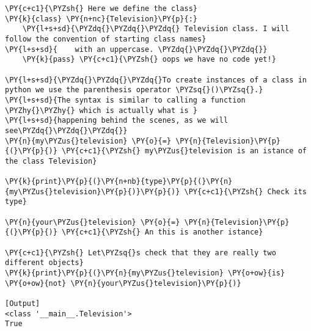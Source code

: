 \begin{Verbatim}[label=\makebox{\url{https://github.com/lucabaldini/cmepda/tree/master/slides/latex/snippets/class\_tv\_basic.py}},commandchars=\\\{\}]
\PY{c+c1}{\PYZsh{} Here we define the class}
\PY{k}{class} \PY{n+nc}{Television}\PY{p}{:}
    \PY{l+s+sd}{\PYZdq{}\PYZdq{}\PYZdq{} Television class. I will follow the convention of starting class names}
\PY{l+s+sd}{    with an uppercase. \PYZdq{}\PYZdq{}\PYZdq{}}
    \PY{k}{pass} \PY{c+c1}{\PYZsh{} oops we have no code yet!}

\PY{l+s+sd}{\PYZdq{}\PYZdq{}\PYZdq{}To create instances of a class in python we use the parenthesis operator \PYZsq{}()\PYZsq{}.}
\PY{l+s+sd}{The syntax is similar to calling a function \PYZhy{}\PYZhy{} which is actually what is }
\PY{l+s+sd}{happening behind the scenes, as we will see\PYZdq{}\PYZdq{}\PYZdq{}}
\PY{n}{my\PYZus{}television} \PY{o}{=} \PY{n}{Television}\PY{p}{(}\PY{p}{)} \PY{c+c1}{\PYZsh{} my\PYZus{}television is an istance of the class Television}

\PY{k}{print}\PY{p}{(}\PY{n+nb}{type}\PY{p}{(}\PY{n}{my\PYZus{}television}\PY{p}{)}\PY{p}{)} \PY{c+c1}{\PYZsh{} Check its type}

\PY{n}{your\PYZus{}television} \PY{o}{=} \PY{n}{Television}\PY{p}{(}\PY{p}{)} \PY{c+c1}{\PYZsh{} An this is another istance}

\PY{c+c1}{\PYZsh{} Let\PYZsq{}s check that they are really two different objects}
\PY{k}{print}\PY{p}{(}\PY{n}{my\PYZus{}television} \PY{o+ow}{is} \PY{o+ow}{not} \PY{n}{your\PYZus{}television}\PY{p}{)}

[Output]
<class '__main__.Television'>
True
\end{Verbatim}